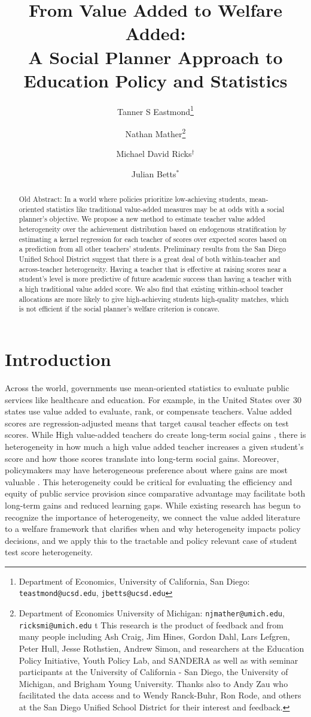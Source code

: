 \documentclass{article}
\title{From Value Added to Welfare Added: \\ A Social Planner Approach to Education Policy and Statistics}
\author{Tanner S Eastmond\thanks{Department of Economics, University of California, San Diego: \texttt{teastmond@ucsd.edu}, \texttt{jbetts@ucsd.edu}} \and Nathan Mather\thanks{Department of Economics University of Michigan: \texttt{njmather@umich.edu}, \texttt{ricksmi@umich.edu} \hspace{11em} {\color{white}t} This research is the product of feedback and from many people including Ash Craig, Jim Hines, Gordon Dahl, Lars Lefgren, Peter Hull, Jesse Rothstien,  Andrew Simon, and  researchers at the Education Policy Initiative, Youth Policy Lab, and SANDERA as well as with seminar participants at the University of California - San Diego, the University of Michigan, and Brigham Young University. Thanks also to Andy Zau who facilitated the data access and to  Wendy Ranck-Buhr, Ron Rode, and others at the San Diego Unified School District for their interest and feedback.} \and Michael David Ricks$^\dagger$ \and Julian Betts$^*$}
\date{\parbox{\linewidth}{\centering%
  This Draft Updated: \today\endgraf
  }}
\theoremstyle{definition}
\theoremstyle{definition}
\theoremstyle{definition}
\theoremstyle{definition}
\begin{document}
\maketitle

\onehalfspacing
\begin{abstract}
{\color{red}Old Abstract:} In a world where policies prioritize low-achieving students, mean-oriented statistics like traditional value-added measures may be at odds with a social planner’s objective. We propose a new method to estimate teacher value added heterogeneity over the achievement distribution based on endogenous stratification by estimating a kernel regression for each teacher of scores over expected scores based on a prediction from all other teachers’ students.  Preliminary results from the San Diego Unified School District suggest that there is a great deal of both within-teacher and across-teacher heterogeneity. Having a teacher that is effective at raising scores near a student’s level is more predictive of future academic success than having a teacher with a high traditional value added score. We also find that existing within-school teacher allocations are more likely to give high-achieving students high-quality matches, which is not efficient if the social planner’s welfare criterion is concave.


\end{abstract}


\doublespacing
\vfill
\pagebreak

\section{Introduction}
    
    Across the world, governments use mean-oriented statistics to evaluate public services like healthcare and education. For example, in the United States over 30 states use value added to evaluate, rank, or compensate teachers.
    Value added scores are regression-adjusted means that target causal teacher effects on test scores. While High value-added teachers do create long-term social gains \citep[e.g.,][]{chetty2014measuring2,pope2017multidimensional}, there is heterogeneity in how much a high value added teacher increases a given student's score and how those scores translate into long-term social gains. \citep[as in][etc.]{Delgado2020,bates2022teacher} Moreover, policymakers may have heterogeneous preference about where gains are most valuable \citep[such as No Child Left Behind, see][]{a}. This heterogeneity could be critical for evaluating the efficiency and equity of public service provision since comparative advantage may facilitate both long-term gains and reduced learning gaps. While existing research has begun to recognize the importance of heterogeneity, we connect the value added literature to a welfare framework that clarifies when and why heterogeneity impacts policy decisions, and we apply this to the tractable and policy relevant case of student test score heterogeneity.  
    
\end{document}
